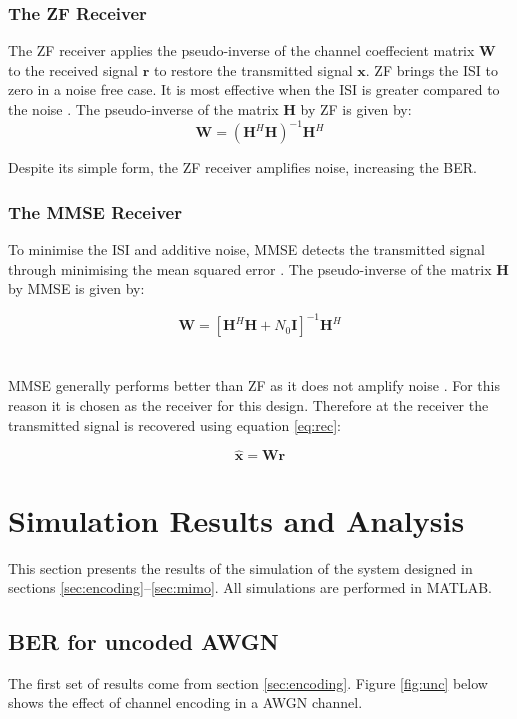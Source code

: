 \documentclass[11pt]{report}
\renewcommand{\vec}[1]{\mathbf{#1}} %
\begin{document}
\subsubsection{The ZF Receiver}
\label{subsub:zf}
The ZF receiver applies the pseudo-inverse of the channel coeffecient matrix $\vec{W}$ to the received signal $\vec{r}$ to restore the transmitted signal $\vec{x}$. ZF brings the ISI to zero in a noise free case. It is most effective when the ISI is greater compared to the noise \cite{46}. The pseudo-inverse of the matrix $\vec{H}$  by ZF is given by:
\begin{equation}
\label{eq:zf}
\vec{W} = (\vec{H}^H\vec{H})^{-1}\vec{H}^H
\end{equation}

Despite its simple form, the ZF receiver amplifies noise, increasing the BER.

\subsubsection{The MMSE Receiver}
To minimise the ISI and additive noise, MMSE detects the transmitted signal through minimising the mean squared error \cite{B9}. The pseudo-inverse of the matrix $\vec{H}$ by MMSE is given by:

\begin{equation}
\label{eq:mmse}
\vec{W} = [\vec{H}^H\vec{H} + N_0\vec{I}]^{-1}\vec{H}^H
\end{equation}
\\
\\
MMSE generally performs better than ZF as it does not amplify noise \cite{46}. For this reason it is chosen as the receiver for this design. Therefore at the receiver the transmitted signal is recovered using equation \ref{eq:rec}:

\begin{equation}
	\label{eq:rec}
	\vec{\hat{x}} = \vec{W}\vec{r}
\end{equation}

\section{Simulation Results and Analysis}
\label{sec:results}
This section presents the results of the simulation of the system designed in sections \ref{sec:encoding}--\ref{sec:mimo}. All simulations are performed in MATLAB.

\subsection{BER for uncoded AWGN}
The first set of results come from section \ref{sec:encoding}. Figure \ref{fig:unc} below shows the effect of channel encoding in a AWGN channel.
\end{document}
